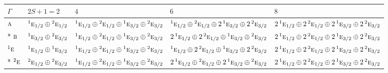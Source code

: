 \documentclass[10pt,a4paper]{article}
\numberwithin{equation}{section}
\newcommand{\irr}[1]{\text{\normalfont\scshape #1}}
\newcommand{\conjpair}[1]{{}^{#1}}
\begin{document}
{\small\setlength{\tabcolsep}{3pt}\begin{longtable}{@{}l>{\RaggedRight\arraybackslash}p{}>{\RaggedRight\arraybackslash}p{}>{\RaggedRight\arraybackslash}p{}>{\RaggedRight\arraybackslash}p{}@{}}\toprule
$\Gamma$ & $2S + 1 = 2$ & $4$ & $6$ & $8$\\\midrule\endhead
\bottomrule\endfoot\endlastfoot
$\irr{a}$ & $\conjpair{1}\irr{e}_{1/2}\oplus \conjpair{2}\irr{e}_{1/2}$ & $\conjpair{1}\irr{e}_{1/2}\oplus \conjpair{2}\irr{e}_{1/2}\oplus \conjpair{1}\irr{e}_{3/2}\oplus \conjpair{2}\irr{e}_{3/2}$ & $\conjpair{1}\irr{e}_{1/2}\oplus \conjpair{2}\irr{e}_{1/2}\oplus 2\,\conjpair{1}\irr{e}_{3/2}\oplus 2\,\conjpair{2}\irr{e}_{3/2}$ & $2\,\conjpair{1}\irr{e}_{1/2}\oplus 2\,\conjpair{2}\irr{e}_{1/2}\oplus 2\,\conjpair{1}\irr{e}_{3/2}\oplus 2\,\conjpair{2}\irr{e}_{3/2}$\\*
$\irr{b}$ & $\conjpair{1}\irr{e}_{3/2}\oplus \conjpair{2}\irr{e}_{3/2}$ & $\conjpair{1}\irr{e}_{1/2}\oplus \conjpair{2}\irr{e}_{1/2}\oplus \conjpair{1}\irr{e}_{3/2}\oplus \conjpair{2}\irr{e}_{3/2}$ & $2\,\conjpair{1}\irr{e}_{1/2}\oplus 2\,\conjpair{2}\irr{e}_{1/2}\oplus \conjpair{1}\irr{e}_{3/2}\oplus \conjpair{2}\irr{e}_{3/2}$ & $2\,\conjpair{1}\irr{e}_{1/2}\oplus 2\,\conjpair{2}\irr{e}_{1/2}\oplus 2\,\conjpair{1}\irr{e}_{3/2}\oplus 2\,\conjpair{2}\irr{e}_{3/2}$\\
$\conjpair{1}\irr{e}$ & $\conjpair{1}\irr{e}_{1/2}\oplus \conjpair{1}\irr{e}_{3/2}$ & $\conjpair{1}\irr{e}_{1/2}\oplus \conjpair{2}\irr{e}_{1/2}\oplus \conjpair{1}\irr{e}_{3/2}\oplus \conjpair{2}\irr{e}_{3/2}$ & $\conjpair{1}\irr{e}_{1/2}\oplus 2\,\conjpair{2}\irr{e}_{1/2}\oplus \conjpair{1}\irr{e}_{3/2}\oplus 2\,\conjpair{2}\irr{e}_{3/2}$ & $2\,\conjpair{1}\irr{e}_{1/2}\oplus 2\,\conjpair{2}\irr{e}_{1/2}\oplus 2\,\conjpair{1}\irr{e}_{3/2}\oplus 2\,\conjpair{2}\irr{e}_{3/2}$\\*
$\conjpair{2}\irr{e}$ & $\conjpair{2}\irr{e}_{1/2}\oplus \conjpair{2}\irr{e}_{3/2}$ & $\conjpair{1}\irr{e}_{1/2}\oplus \conjpair{2}\irr{e}_{1/2}\oplus \conjpair{1}\irr{e}_{3/2}\oplus \conjpair{2}\irr{e}_{3/2}$ & $2\,\conjpair{1}\irr{e}_{1/2}\oplus \conjpair{2}\irr{e}_{1/2}\oplus 2\,\conjpair{1}\irr{e}_{3/2}\oplus \conjpair{2}\irr{e}_{3/2}$ & $2\,\conjpair{1}\irr{e}_{1/2}\oplus 2\,\conjpair{2}\irr{e}_{1/2}\oplus 2\,\conjpair{1}\irr{e}_{3/2}\oplus 2\,\conjpair{2}\irr{e}_{3/2}$\\
\bottomrule\end{longtable}}
\end{document}
